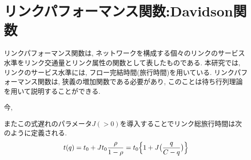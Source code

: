 \documentclass[a4paper,11pt,oneside,openany,uplatex]{jsbook}
\begin{document}
\section{リンクパフォーマンス関数:Davidson関数}
リンクパフォーマンス関数は, ネットワークを構成する個々のリンクのサービス水準をリンク交通量とリンク属性の関数として表したものである. 
本研究では, リンクのサービス水準には, フロー完結時間(旅行時間)を用いている. 
リンクパフォーマンス関数は, 狭義の増加関数である必要があり, このことは待ち行列理論を用いて説明することができる. 

今, 


またこの式遅れのパラメータ$J(>0)$を導入することでリンク総旅行時間は次のように定義される. 
\begin{eqnarray}
t(q) = t_{0} + J t_{0} \frac{\rho}{1-\rho} = t_{0}\Bigl\{ 1 + J \bigl(
\frac{q}{C-q} \bigr) \Bigr\}
\end{eqnarray}
\end{document}
